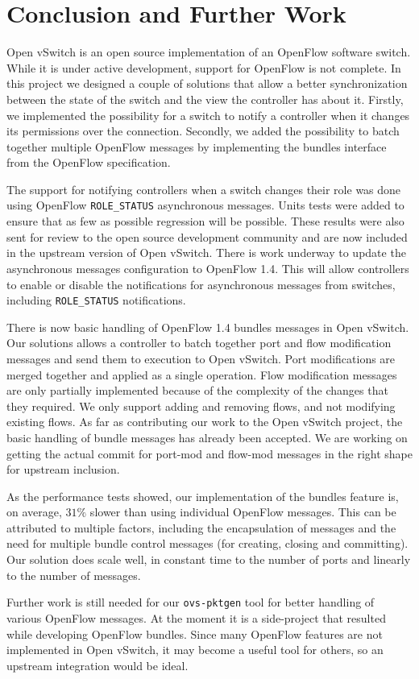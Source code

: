 \chapter{Conclusion and Further Work}
\label{chapter:conclusion}  
 

Open vSwitch is an open source implementation of an OpenFlow software switch. While it is under active development,
support for OpenFlow is not complete. In this project we designed a couple of solutions that allow a better
synchronization between the state of the switch and the view the controller has about it. Firstly, we implemented
the possibility for a switch to notify a controller when it changes its permissions over the connection. Secondly,
we added the possibility to batch together multiple OpenFlow messages by implementing the bundles interface
from the OpenFlow specification.

The support for notifying controllers when a switch changes their role was done using OpenFlow \texttt{ROLE_STATUS}
asynchronous messages. Units tests were added to ensure that as few as possible regression will be possible.
These results were also sent for review to the open source development community and are now included in the
upstream version of Open vSwitch. There is work underway to update the asynchronous messages configuration to
OpenFlow 1.4. This will allow controllers to enable or disable the notifications for asynchronous messages
from switches, including \texttt{ROLE_STATUS} notifications.

There is now basic handling of OpenFlow 1.4 bundles messages in Open vSwitch. Our solutions allows a controller
to batch together port and flow modification messages and send them to execution to Open vSwitch. Port modifications
are merged together and applied as a single operation. Flow modification messages are only partially implemented
because of the complexity of the changes that they required. We only support adding and removing flows, and not
modifying existing flows. As far as contributing our work to the Open vSwitch project, the basic handling of bundle
messages has already been accepted. We are working on getting the actual commit for port-mod and flow-mod messages
in the right shape for upstream inclusion.

As the performance tests showed, our implementation of the bundles feature is, on average, $31\%$ slower than using
individual OpenFlow messages. This can be attributed to multiple factors, including the encapsulation of messages
and the need for multiple bundle control messages (for creating, closing and committing). Our solution does scale
well, in constant time to the number of ports and linearly to the number of messages.

Further work is still needed for our \texttt{ovs-pktgen} tool for better handling of various OpenFlow messages. At the
moment it is a side-project that resulted while developing OpenFlow bundles. Since many OpenFlow features are
not implemented in Open vSwitch, it may become a useful tool for others, so an upstream integration would be ideal.
